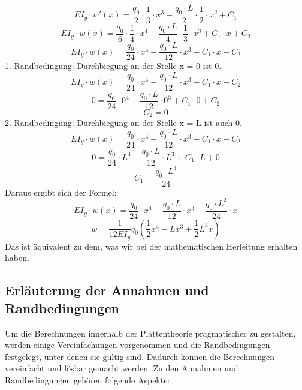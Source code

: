 \begin{equation}
	EI_y\cdot w'\left(x\right)=
	\frac{q_0}{2}\cdot\frac{1}{3}\cdot x^3-\frac{q_0\cdot L}{2}\cdot\frac{1}{2}\cdot x^2+C_1
\end{equation}
\begin{equation}
	EI_y\cdot w\left(x\right)=
	\frac{q_0}{6}\cdot\frac{1}{4}\cdot x^4-\frac{q_0\cdot L}{4}\cdot\frac{1}{3}\cdot x^3+C_1\cdot x+C_2
\end{equation}
\begin{equation}
	EI_y\cdot w\left(x\right)=
	\frac{q_0}{24}\cdot x^4-\frac{q_0\cdot L}{12}\cdot x^3+C_1\cdot x+C_2
\end{equation}
1. Randbedingung: Durchbiegung an der Stelle x = 0 ist 0.
\begin{equation}
	EI_y\cdot w\left(x\right)=
	\frac{q_0}{24}\cdot x^4-\frac{q_0\cdot L}{12}\cdot x^3+C_1\cdot x+C_2
\end{equation}
\begin{equation}
	0=
	\frac{q_0}{24}\cdot0^4-\frac{q_0\cdot L}{12}\cdot0^3+C_1\cdot0+C_2
\end{equation}
\begin{equation}
	C_2=0
\end{equation}
2. Randbedingung: Durchbiegung an der Stelle x = L ist auch 0.
\begin{equation}
	EI_y\cdot w\left(x\right)=
	\frac{q_0}{24}\cdot x^4-\frac{q_0\cdot L}{12}\cdot x^3+C_1\cdot x+C_2
\end{equation}
\begin{equation}
	0=
	\frac{q_0}{24}\cdot L^4-\frac{q_0\cdot L}{12}\cdot L^3+C_1\cdot L+0
\end{equation}
\begin{equation}
	C_1=
	\frac{q_0\cdot L^3}{24}
\end{equation}
Daraus ergibt sich der Formel:
\begin{equation}
	EI_y\cdot w\left(x\right)=
	\frac{q_0}{24}\cdot x^4-\frac{q_0\cdot L}{12}\cdot x^3+\frac{q_0\cdot L^3}{24}\cdot x
\end{equation}
\begin{equation}
	w=
	\frac{1}{12EI_y}q_0\left(\frac{1}{2}x^4-Lx^3+\frac{1}{2}L^3x\right)
\end{equation}
Das ist äquivalent zu dem, was wir bei der mathematischen Herleitung erhalten haben.

\subsection{Erläuterung der Annahmen und Randbedingungen}
Um die Berechnungen innerhalb der Plattentheorie pragmatischer zu gestalten, werden einige Vereinfachungen vorgenommen und die Randbedingungen festgelegt, unter denen sie gültig sind.
Dadurch können die Berechnungen vereinfacht und lösbar gemacht werden.
Zu den Annahmen und Randbedingungen gehören folgende Aspekte:

